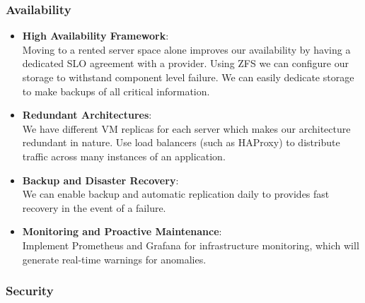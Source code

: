 \documentclass{llncs}
\begin{document}
\subsubsection*{Availability}
\begin{itemize}
  \item \textbf{High Availability Framework}:
        \\
        Moving to a rented server space alone improves our availability by having a dedicated SLO agreement with a provider.
        Using ZFS we can configure our storage to withstand component level failure.
        We can easily dedicate storage to make backups of all critical information.
        \\
  \item \textbf{Redundant Architectures}:
        \\ 
        We have different VM replicas for each server which makes our architecture redundant in nature.
        Use load balancers (such as HAProxy) to distribute traffic across many instances of an application.
        \\    
  \item \textbf{Backup and Disaster Recovery}:
        \\ 
        We can enable backup and automatic replication daily to provides fast recovery in the event of a failure.
        \\ 
  \item \textbf{Monitoring and Proactive Maintenance}:
        \\ 
        Implement Prometheus and Grafana for infrastructure monitoring, which will generate real-time warnings for anomalies.
        \\ 
\end{itemize}

\subsubsection*{Security}
\end{document}
